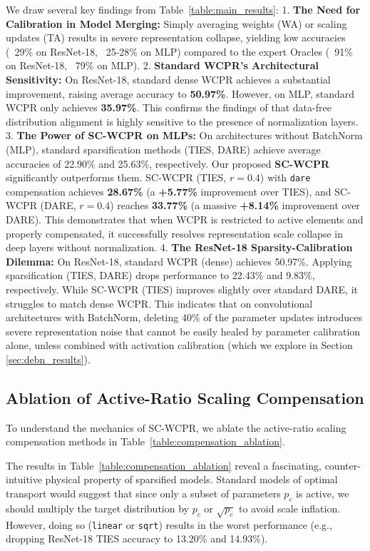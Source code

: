 \documentclass{article}
\theoremstyle{plain}
\theoremstyle{definition}
\theoremstyle{remark}
\begin{document}
We draw several key findings from Table~\ref{table:main_results}:
1. \textbf{The Need for Calibration in Model Merging:} Simply averaging weights (WA) or scaling updates (TA) results in severe representation collapse, yielding low accuracies (~29\% on ResNet-18, ~25-28\% on MLP) compared to the expert Oracles (~91\% on ResNet-18, ~79\% on MLP). 
2. \textbf{Standard WCPR's Architectural Sensitivity:} On ResNet-18, standard dense WCPR achieves a substantial improvement, raising average accuracy to \textbf{50.97\%}. However, on MLP, standard WCPR only achieves \textbf{35.97\%}. This confirms the findings of \citet{submission10} that data-free distribution alignment is highly sensitive to the presence of normalization layers.
3. \textbf{The Power of SC-WCPR on MLPs:} On architectures without BatchNorm (MLP), standard sparsification methods (TIES, DARE) achieve average accuracies of 22.90\% and 25.63\%, respectively. Our proposed \textbf{SC-WCPR} significantly outperforms them. SC-WCPR (TIES, $r=0.4$) with \texttt{dare} compensation achieves \textbf{28.67\%} (a \textbf{+5.77\%} improvement over TIES), and SC-WCPR (DARE, $r=0.4$) reaches \textbf{33.77\%} (a massive \textbf{+8.14\%} improvement over DARE). This demonstrates that when WCPR is restricted to active elements and properly compensated, it successfully resolves representation scale collapse in deep layers without normalization.
4. \textbf{The ResNet-18 Sparsity-Calibration Dilemma:} On ResNet-18, standard WCPR (dense) achieves 50.97\%. Applying sparsification (TIES, DARE) drops performance to 22.43\% and 9.83\%, respectively. While SC-WCPR (TIES) improves slightly over standard DARE, it struggles to match dense WCPR. This indicates that on convolutional architectures with BatchNorm, deleting 40\% of the parameter updates introduces severe representation noise that cannot be easily healed by parameter calibration alone, unless combined with activation calibration (which we explore in Section \ref{sec:debn_results}).

\subsection{Ablation of Active-Ratio Scaling Compensation}

To understand the mechanics of SC-WCPR, we ablate the active-ratio scaling compensation methods in Table~\ref{table:compensation_ablation}.



The results in Table~\ref{table:compensation_ablation} reveal a fascinating, counter-intuitive physical property of sparsified models. Standard models of optimal transport would suggest that since only a subset of parameters $p_c$ is active, we should multiply the target distribution by $p_c$ or $\sqrt{p_c}$ to avoid scale inflation. However, doing so (\texttt{linear} or \texttt{sqrt}) results in the worst performance (e.g., dropping ResNet-18 TIES accuracy to 13.20\% and 14.93\%).
\end{document}
